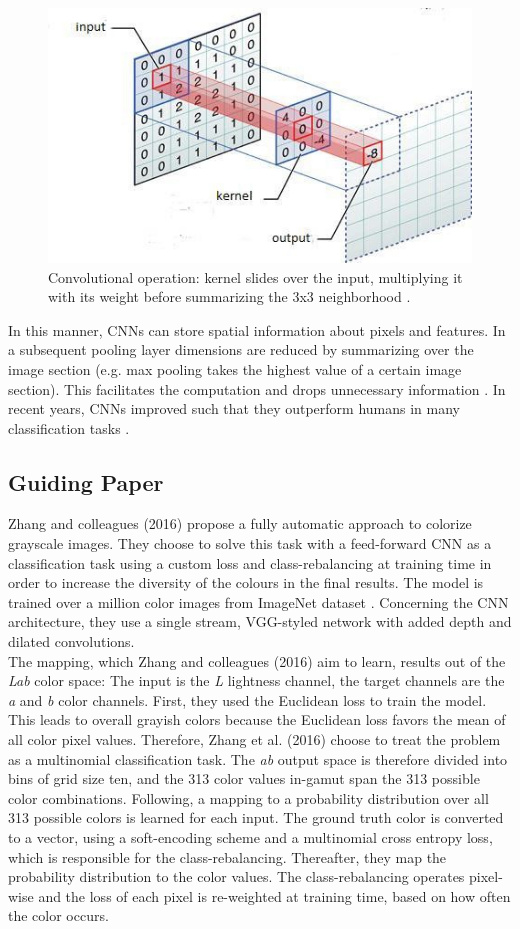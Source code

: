 \documentclass[12pt,letterpaper]{article}
\begin{document}
\begin{figure}
	\centering
	\includegraphics[width=.48\textwidth]{cnn.png}
	\caption{Convolutional operation: kernel slides over the input, multiplying it with its weight before summarizing the 3x3 neighborhood \citep{Escontrela.2018}.}
	\label{convolut}
\end{figure}
In this manner, CNNs can store spatial information about pixels and features. In a subsequent pooling layer dimensions are reduced by summarizing over the image section (e.g. max pooling takes the highest value of a certain image section). This facilitates the computation and drops unnecessary information \citep{Lecture.2019}. In recent years, CNNs improved such that they outperform humans in many classification tasks \citep{Russakovsky.2014}.

\subsection{Guiding Paper} 
Zhang and colleagues (2016) propose a fully automatic approach to colorize grayscale images. They choose to solve this task with a feed-forward CNN as a classification task using a custom loss and class-rebalancing at training time in order to increase the diversity of the colours in the final results. The model is trained over a million color images from ImageNet dataset \citep{Russakovsky.2014}. Concerning the CNN architecture, they use a single stream, VGG-styled network with added depth and dilated convolutions.\\
The mapping, which Zhang and colleagues (2016) aim to learn, results out of the \emph{Lab} color space: The input is the \emph{L} lightness channel, the target channels are the \emph{a} and \emph{b} color channels. First, they used the Euclidean loss to train the model. This leads to overall grayish colors because the Euclidean loss favors the mean of all color pixel values. Therefore, Zhang et al. (2016) choose to treat the problem as a multinomial classification task. The \emph{ab} output space is therefore divided into bins of grid size ten, and the 313 color values in-gamut span the 313 possible color combinations. Following, a mapping to a probability distribution over all 313 possible colors is learned for each input. The ground truth color is converted to a vector, using a soft-encoding scheme and a multinomial cross entropy loss, which is responsible for the class-rebalancing. Thereafter, they map the probability distribution to the color values. The class-rebalancing operates pixel-wise and the loss of each pixel is re-weighted at training time, based on how often the color occurs.
\end{document}
